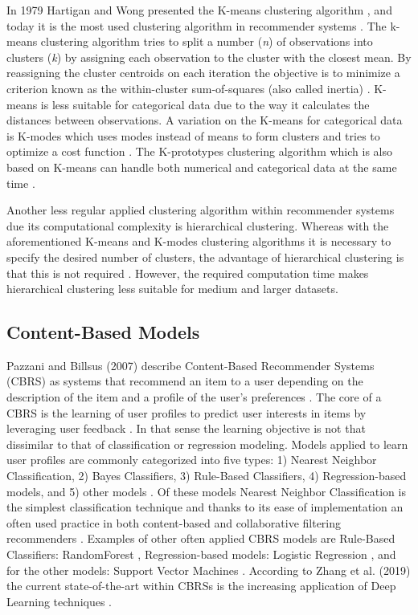 In 1979 Hartigan and Wong presented the K-means clustering algorithm \cite{hartigan1979algorithm}, and today it is the most used clustering algorithm in recommender systems \cite{aggarwal2016recommender}.
The k-means clustering algorithm tries to split a number (\textit{n}) of observations into clusters (\textit{k}) by assigning each observation to the cluster with the closest mean.
By reassigning the cluster centroids on each iteration the objective is to minimize a criterion known as the within-cluster sum-of-squares (also called inertia) \cite{mackay2003example}. 
K-means is less suitable for categorical data due to the way it calculates the distances between observations.
A variation on the K-means for categorical data is K-modes which uses modes instead of means to form clusters and tries to optimize a cost function \cite{huang1997clustering, huang1998extensions}.
The K-prototypes clustering algorithm which is also based on K-means can handle both numerical and categorical data at the same time \cite{huang1997clustering}.

Another less regular applied clustering algorithm within recommender systems due its computational complexity is hierarchical clustering.
Whereas with the aforementioned K-means and K-modes clustering algorithms it is necessary to specify the desired number of clusters, the advantage of hierarchical clustering is that this is not required \cite{rokach2005clustering}.
However, the required computation time makes hierarchical clustering less suitable for medium and larger datasets. 

\subsection{Content-Based Models}
\label{sec:cbm}
Pazzani and Billsus (2007) describe Content-Based Recommender Systems (CBRS) as systems that recommend an item to a user depending on the description of the item and a profile of the user’s preferences \cite{pazzani2007content}.
The core of a CBRS is the learning of user profiles to predict user interests in items by leveraging user feedback \cite{aggarwal2016content}.
In that sense the learning objective is not that dissimilar to that of classification or regression modeling.
Models applied to learn user profiles are commonly categorized into five types: 1) Nearest Neighbor Classification, 2) Bayes Classifiers, 3) Rule-Based Classifiers, 4) Regression-based models, and 5) other models \cite{aggarwal2016content, pazzani2007content}.
Of these models Nearest Neighbor Classification is the simplest classification technique and thanks to its ease of implementation an often used practice in both content-based and collaborative filtering recommenders \cite{balabanovic1997fab}.
Examples of other often applied CBRS models  are Rule-Based Classifiers: RandomForest  \cite{zhang2016three, breiman2001random}, Regression-based models: Logistic Regression \cite{aggarwal2016content, hosmer2013applied}, and for the other models: Support Vector Machines \cite{aggarwal2016content, burges1998tutorial}.
According to Zhang et al. (2019) the current state-of-the-art within CBRSs is the increasing application of Deep Learning techniques \cite{zhang2019deep}.

